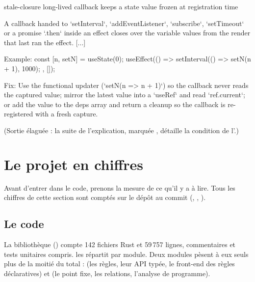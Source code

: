 \begin{sortie}
stale-closure
  long-lived callback keeps a state value frozen at registration time

A callback handed to `setInterval`, `addEventListener`, `subscribe`, `setTimeout` or a promise `.then` inside an effect closes over the variable values from the render that last ran the effect. [...]

Example:
  const [n, setN] = useState(0);
  useEffect(() => { setInterval(() => setN(n + 1), 1000); }, []);

Fix:
  Use the functional updater (`setN(n => n + 1)`) so the callback never reads the captured value; mirror the latest value into a `useRef` and read `ref.current`; or add the value to the deps array and return a cleanup so the callback is re-registered with a fresh capture.
\end{sortie}
(Sortie élaguée : la suite de l'explication, marquée \code{[...]}, détaille
la condition de l'\Error.)

\section{Le projet en chiffres}
\label{sec:introduction-chiffres}

Avant d'entrer dans le code, prenons la mesure de ce qu'il y a à lire. Tous les
chiffres de cette section sont comptés sur le dépôt au commit
\snapshotCommit{} (, , ).

\subsection{Le code}

La bibliothèque  () compte 142 fichiers Rust et
59\,757 lignes, commentaires et tests unitaires compris.
 les répartit par module. Deux modules pèsent à
eux seuls plus de la moitié du total :  (les règles, leur API
typée, le front-end des règles déclaratives) et  (le point
fixe, les relations, l'analyse de programme).

